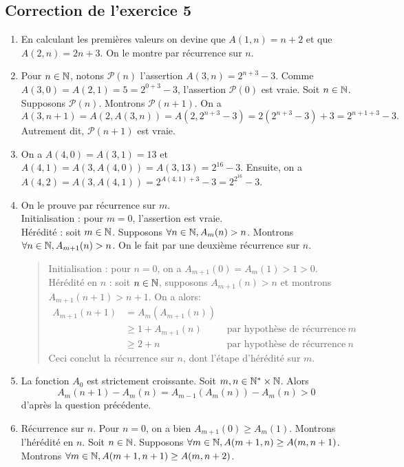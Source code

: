 \documentclass[11pt,a4paper]{article}
\begin{document}
\subsection*{Correction de l'exercice 5}

\begin{enumerate}
\item En calculant les premières valeurs on devine que $A(1,n) = n+2$ et que $A(2,n) = 2n+3$. On le montre par récurrence sur $n$.
\item Pour $n\in \mathbb{N}$, notons $\mathcal P(n)$ l'assertion $A(3,n) = 2^{n+3} -3$. Comme $A(3,0) = A(2,1) = 5 = 2^{0+3}-3$, l'assertion $\mathcal P(0)$ est vraie.
Soit $n\in\mathbb{N}$. Supposons $\mathcal P(n)$. Montrons $\mathcal P(n+1)$. On a 
\[ A(3,n+1) = A(2,A(3,n)) = A(2,2^{n+3}-3)
= 2(2^{n+3}-3)+3 = 2^{n+1+3}-3. \]
Autrement dit, $\mathcal P(n+1)$ est vraie.
\item On a $A(4,0) = A(3,1) = 13$ et $A(4,1)  = A(3,A(4,0)) = A(3,13) = 2^{16}-3$.%
 Ensuite, on a $A(4,2) = A(3,A(4,1)) = 2^{A(4,1)+3}-3 = 2^{2^{16}}-3$.%
\item On le prouve par récurrence sur $m$.\\
Initialisation : pour $m=0$, l'assertion est vraie.\\
Hérédité :  soit $m\in \mathbb{N}$. Supposons $\forall n\in\mathbb{N}, A_m(n)>n$. Montrons $\forall n\in\mathbb{N}, A_{m+1}(n)>n$. On le fait par une deuxième récurrence sur $n$. 
\begin{quote}
Initialisation : pour $n=0$, on a $A_{m+1}(0) = A_m(1) > 1 > 0$.\\
Hérédité en $n$ : soit $n\in \mathbb{N}$, supposons $A_{m+1}(n)>n$ et montrons $A_{m+1}(n+1)>n+1$.
On a alors:
\begin{align*}
A_{m+1}(n+1) &= A_m(A_{m+1}(n)) \\
&\geq 1+ A_{m+1}(n) & \text{ par hypothèse de récurrence sur } m\\
&\geq 2+ n & \text{ par hypothèse de récurrence sur } n
\end{align*}
Ceci conclut la récurrence sur $n$, dont l'étape d'hérédité sur $m$.
\end{quote}
\item La fonction $A_0$ est strictement croissante. Soit $m, n\in \mathbb{N}^*\times \mathbb{N}$. Alors 
\[ A_m(n+1) - A_m(n) = A_{m-1}(A_m(n)) - A_m(n) >0\]
d'après la question précédente.
\item Récurrence sur $n$. Pour $n=0$, on a bien $A_{m+1}(0) \geq A_m(1)$. Montrons l'hérédité en $n$. Soit $n\in \mathbb{N}$. Supposons $\forall m\in\mathbb{N}, A(m+1,n) \geq A(m,n+1)$. Montrons $\forall m\in\mathbb{N}, A(m+1,n+1) \geq A(m,n+2)$.

\end{enumerate}
\end{document}
